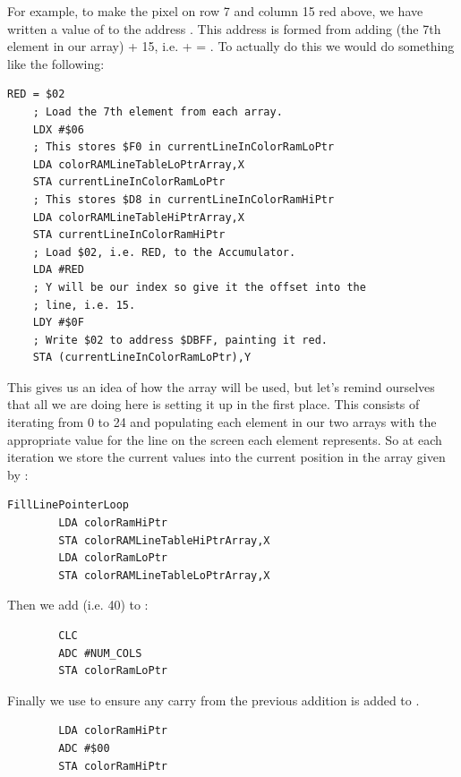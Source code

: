 For example, to make the pixel on row 7 and column 15 red above, we have written a value of  to the address . This 
address is
formed from adding  (the 7th element in our array) + 15, i.e.  +  = . 
To actually do this we would do something like the following:
 
\begin{lstlisting}[basicstyle=\ttfamily\scriptsize]
    RED = $02
    ; Load the 7th element from each array.
    LDX #$06
    ; This stores $F0 in currentLineInColorRamLoPtr
    LDA colorRAMLineTableLoPtrArray,X
    STA currentLineInColorRamLoPtr
    ; This stores $D8 in currentLineInColorRamHiPtr
    LDA colorRAMLineTableHiPtrArray,X
    STA currentLineInColorRamHiPtr
    ; Load $02, i.e. RED, to the Accumulator. 
    LDA #RED
    ; Y will be our index so give it the offset into the
    ; line, i.e. 15. 
    LDY #$0F
    ; Write $02 to address $DBFF, painting it red.
    STA (currentLineInColorRamLoPtr),Y
\end{lstlisting}

This gives us an idea of how the array will be used, but let's remind ourselves that all we are doing here is setting
it up in the first place. This consists of iterating from 0 to 24 and populating each element in our two arrays with
the appropriate value for the line on the screen each element represents. So at each iteration we store
the current values into the current position in the array given by :

\begin{lstlisting}
FillLinePointerLoop
        LDA colorRamHiPtr
        STA colorRAMLineTableHiPtrArray,X
        LDA colorRamLoPtr
        STA colorRAMLineTableLoPtrArray,X
\end{lstlisting}

Then we add   (i.e. 40) to : 

\begin{lstlisting}
        CLC 
        ADC #NUM_COLS
        STA colorRamLoPtr
\end{lstlisting}

Finally we use  to ensure any carry from the previous addition is added to . 

\begin{lstlisting}
        LDA colorRamHiPtr
        ADC #$00
        STA colorRamHiPtr
\end{lstlisting}

